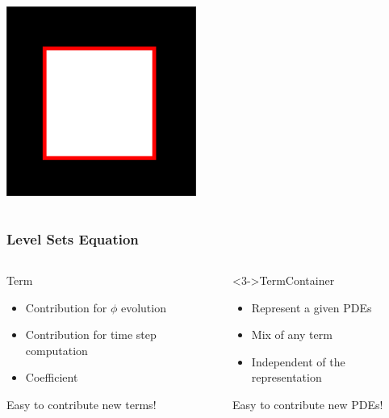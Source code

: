 \begin{frame}
\begin{columns}
{\begin{center}
 \includegraphics[width=0.8\textwidth]{../Art/MalcolmLayers.png}
\end{center}
}

\end{columns}

\end{frame}


\begin{frame}
\frametitle{Level Sets Equation}

\begin{columns}
  \begin{block}{Term}
    \begin{itemize}
      \item Contribution for $\phi$ evolution
      \item Contribution for time step computation
      \item Coefficient
    \end{itemize}
  \alert<2>{Easy to contribute new terms!}
  \end{block}

  \begin{block}<3->{TermContainer}
    \begin{itemize}
      \item Represent a given PDEs
      \item Mix of any term
      \item Independent of the representation
    \end{itemize}
  \alert<4>{Easy to contribute new PDEs!}
  \end{block}

\end{columns}

\end{frame}

